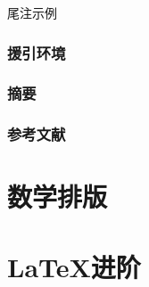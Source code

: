 \documentclass[twoside]{ctexart} %
\begin{document}
            尾注示例
            
        \subsubsection{援引环境}

        \subsubsection{摘要}

        \subsubsection{参考文献}

\section{数学排版}

\section{\LaTeX 进阶}

    
    
    
    
    
\theendnotes
\end{document}
